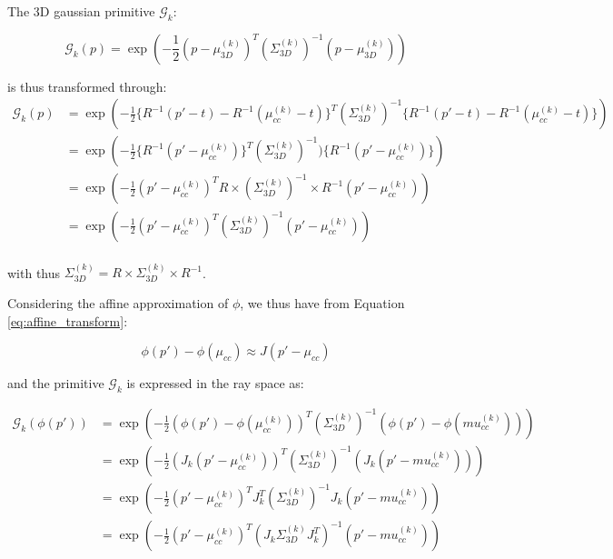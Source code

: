 The 3D gaussian primitive $\mathcal{G}_{k}$: 

\begin{equation}
    \mathcal{G}_{k}(p) = \exp \left(-\frac{1}{2}(p-\mu^{(k)}_{3D})^{T}(\Sigma^{(k)}_{3D})^{-1}(p-\mu^{(k)}_{3D})\right)
  \end{equation}
  
is thus transformed through: 
\begin{equation}
    \begin{aligned}
    \mathcal{G}_{k}(p) &= \exp \left( -\frac{1}{2} \{R^{-1}(p'-t) - R^{-1}(\mu^{(k)}_{cc} -t)\}^{T} (\Sigma^{(k)}_{3D})^{-1}\{R^{-1}(p'-t) - R^{-1}(\mu^{(k)}_{cc} -t)\}  \right) \\
    &= \exp \left( -\frac{1}{2}\{ R^{-1}(p'-\mu^{(k)}_{cc})\}^{T}(\Sigma^{(k)}_{3D})^{-1})\{ R^{-1}(p'-\mu^{(k)}_{cc})\} \right) \\
    &= \exp \left( -\frac{1}{2}(p'-\mu^{(k)}_{cc})^{T}R\times(\Sigma^{(k)}_{3D})^{-1}\times R^{-1}(p'-\mu^{(k)}_{cc})\right) \\
    &= \exp \left( -\frac{1}{2}(p'-\mu^{(k)}_{cc})^{T}(\Sigma^{(k)}_{3D})^{-1}(p'-\mu^{(k)}_{cc})\right) \\
    \end{aligned}
\end{equation}

with thus $\Sigma^{(k)}_{3D} = R\times \Sigma^{(k)}_{3D}\times R^{-1}$. 


Considering the affine approximation of $\phi$, we thus have from Equation \eqref{eq:affine_transform}: 

\begin{equation}
  \phi(p') - \phi(\mu_{cc}) \approx J(p' - \mu_{cc})
\end{equation}

and the primitive $\mathcal{G}_{k}$ is expressed in the ray space as: 

\begin{equation}
  \begin{aligned}
\mathcal{G}_{k}(\phi(p')) &= \exp \left( -\frac{1}{2}(\phi(p')-\phi(\mu^{(k)}_{cc}))^{T}(\Sigma^{(k)}_{3D})^{-1}(\phi(p')-\phi(mu^{(k)}_{cc}))\right)\\
                        &= \exp \left( -\frac{1}{2}(J_{k}(p'-\mu^{(k)}_{cc}))^{T}(\Sigma^{(k)}_{3D})^{-1}(J_{k}(p'-mu^{(k)}_{cc}))\right) \\
                        &= \exp \left( -\frac{1}{2}(p'-\mu^{(k)}_{cc})^{T}J_{k}^{T}(\Sigma^{(k)}_{3D})^{-1}J_{k}(p'-mu^{(k)}_{cc})\right)\\
                        &= \exp \left( -\frac{1}{2}(p'-\mu^{(k)}_{cc})^{T}(J_{k}\Sigma^{(k)}_{3D}J_{k}^{T})^{-1}(p'-mu^{(k)}_{cc})\right)
  \end{aligned}
\end{equation}

